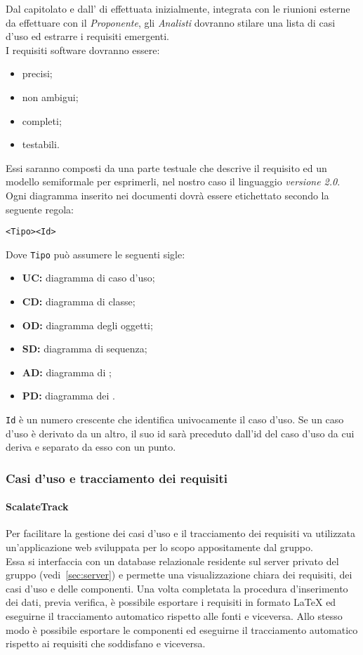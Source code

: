 \documentclass{scalatekids-article}
\begin{document}
Dal capitolato e dall' di  effettuata
inizialmente, integrata con le riunioni esterne da effettuare con il
\textit{Proponente}, gli \textit{Analisti} dovranno stilare una lista di casi
d'uso ed estrarre i requisiti emergenti.\\
I requisiti software dovranno essere:
\begin{itemize}
\item precisi;
\item non ambigui;
\item completi;
\item testabili.
\end{itemize}
Essi saranno composti da una parte testuale che descrive il requisito ed un
modello semiformale per esprimerli, nel nostro caso il linguaggio 
\textit{versione 2.0}. Ogni diagramma inserito nei documenti dovrà essere
etichettato secondo la seguente regola:
\begin{center}
  \verb=<Tipo><Id>=
\end{center}
Dove \verb=Tipo= può assumere le seguenti sigle:
\begin{itemize}
\item\textbf{UC:} diagramma di caso d'uso;
\item\textbf{CD:} diagramma di classe;
\item\textbf{OD:} diagramma degli oggetti;
\item\textbf{SD:} diagramma di sequenza;
\item\textbf{AD:} diagramma di ;
\item\textbf{PD:} diagramma dei .
\end{itemize}
\verb=Id= è un numero crescente che identifica
univocamente il caso d'uso. Se un caso d'uso è derivato da un altro, il suo id
sarà preceduto dall'id del caso d'uso da cui deriva e separato da esso con un
punto.

\subsubsection{Casi d'uso e tracciamento dei requisiti}

\label{sec:front-end}

\paragraph{ScalateTrack}
\label{sec:scalatetrack}

Per facilitare la gestione dei casi d'uso e il tracciamento dei requisiti va
utilizzata un'applicazione web sviluppata per lo scopo appositamente dal
gruppo.\\Essa si interfaccia con un database relazionale residente sul server
privato del gruppo (vedi~\ref{sec:server}) e permette una visualizzazione chiara
dei requisiti, dei casi d'uso e delle componenti. Una volta completata la
procedura d'inserimento dei dati, previa verifica, è possibile esportare i
requisiti in formato \LaTeX\xspace ed eseguirne il tracciamento automatico
rispetto alle fonti e viceversa. Allo stesso modo è possibile esportare le
componenti ed eseguirne il tracciamento automatico rispetto ai requisiti
che soddisfano e viceversa.
\end{document}
